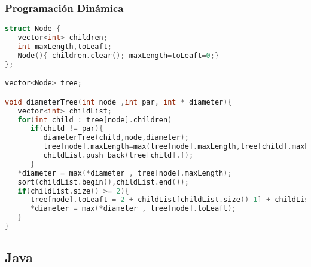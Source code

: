 \subsubsection{Programación Dinámica}
\begin{lstlisting}[language=C++]
struct Node {
   vector<int> children;
   int maxLength,toLeaft;
   Node(){ children.clear(); maxLength=toLeaft=0;}
};

vector<Node> tree;

void diameterTree(int node ,int par, int * diameter){
   vector<int> childList;
   for(int child : tree[node].children)
      if(child != par){
         diameterTree(child,node,diameter);
         tree[node].maxLength=max(tree[node].maxLength,tree[child].maxLength+1);
         childList.push_back(tree[child].f);
	  }
   *diameter = max(*diameter , tree[node].maxLength);
   sort(childList.begin(),childList.end());
   if(childList.size() >= 2){
      tree[node].toLeaft = 2 + childList[childList.size()-1] + childList[childList.size()-2];
      *diameter = max(*diameter , tree[node].toLeaft);
   }
}
\end{lstlisting}

\subsection{Java}